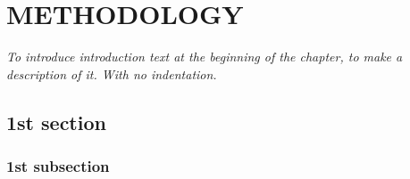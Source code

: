 
\chapter{METHODOLOGY} %
\label{Methodology}

\vspace*{3\baselineskip} %

\noindent \textit{To introduce introduction text at the beginning of the chapter, to make a description of it. With no indentation.}

\section{1st section}

\blindtext

\subsection{1st subsection}